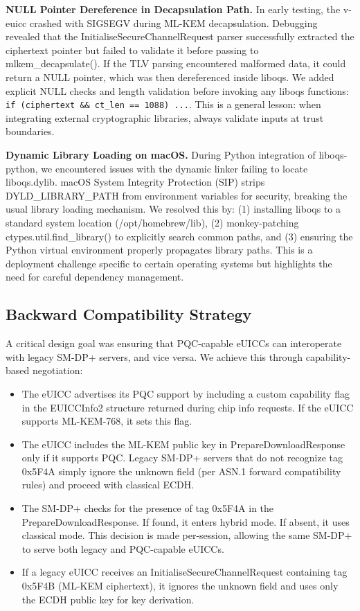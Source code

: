 \documentclass{easychair}
\begin{document}
\textbf{NULL Pointer Dereference in Decapsulation Path.} In early testing, the v-euicc crashed with SIGSEGV during ML-KEM decapsulation. Debugging revealed that the InitialiseSecureChannelRequest parser successfully extracted the ciphertext pointer but failed to validate it before passing to mlkem\_decapsulate(). If the TLV parsing encountered malformed data, it could return a NULL pointer, which was then dereferenced inside liboqs. We added explicit NULL checks and length validation before invoking any liboqs functions: \texttt{if (ciphertext \&\& ct\_len == 1088) ...}. This is a general lesson: when integrating external cryptographic libraries, always validate inputs at trust boundaries.

\textbf{Dynamic Library Loading on macOS.} During Python integration of liboqs-python, we encountered issues with the dynamic linker failing to locate liboqs.dylib. macOS System Integrity Protection (SIP) strips DYLD\_LIBRARY\_PATH from environment variables for security, breaking the usual library loading mechanism. We resolved this by: (1) installing liboqs to a standard system location (/opt/homebrew/lib), (2) monkey-patching ctypes.util.find\_library() to explicitly search common paths, and (3) ensuring the Python virtual environment properly propagates library paths. This is a deployment challenge specific to certain operating systems but highlights the need for careful dependency management.

\subsection{Backward Compatibility Strategy}

A critical design goal was ensuring that PQC-capable eUICCs can interoperate with legacy SM-DP+ servers, and vice versa. We achieve this through capability-based negotiation:

\begin{itemize}
\item The eUICC advertises its PQC support by including a custom capability flag in the EUICCInfo2 structure returned during chip info requests. If the eUICC supports ML-KEM-768, it sets this flag.
\item The eUICC includes the ML-KEM public key in PrepareDownloadResponse only if it supports PQC. Legacy SM-DP+ servers that do not recognize tag 0x5F4A simply ignore the unknown field (per ASN.1 forward compatibility rules) and proceed with classical ECDH.
\item The SM-DP+ checks for the presence of tag 0x5F4A in the PrepareDownloadResponse. If found, it enters hybrid mode. If absent, it uses classical mode. This decision is made per-session, allowing the same SM-DP+ to serve both legacy and PQC-capable eUICCs.
\item If a legacy eUICC receives an InitialiseSecureChannelRequest containing tag 0x5F4B (ML-KEM ciphertext), it ignores the unknown field and uses only the ECDH public key for key derivation.
\end{itemize}
\end{document}
